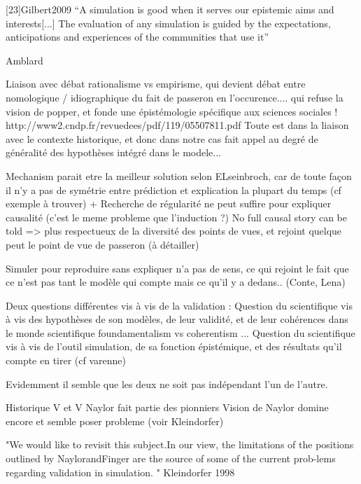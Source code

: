 


[23]Gilbert2009 \enquote{A simulation is good when it serves our epistemic aims and interests[...] The evaluation of any simulation is guided by the expectations, anticipations and experiences of the communities that use it}

Amblard

Liaison avec débat rationalisme vs empirisme, qui devient débat entre nomologique / idiographique
du fait de passeron en l'occurence.... qui refuse la vision de popper, et fonde une épistémologie spécifique aux sciences sociales ! http://www2.cndp.fr/revuedees/pdf/119/05507811.pdf
Toute est dans la liaison avec le contexte historique, et donc dans notre cas fait appel au degré de généralité des hypothèses intégré dans le modele...

Mechanism parait etre la meilleur solution selon ELseinbroch, car de toute façon il n'y a pas de symétrie entre prédiction et explication la plupart du temps (cf exemple à trouver) + Recherche de régularité ne peut suffire pour expliquer causalité (c'est le meme probleme que l'induction ?)
No full causal story can be told => plus respectueux de la diversité des points de vues, et rejoint quelque peut le point de vue de passeron (à détailler)

Simuler pour reproduire sans expliquer n'a pas de sens, ce qui rejoint le fait que ce n'est pas tant le modèle qui compte mais ce qu'il y a dedans.. (Conte, Lena)



Deux questions différentes vis à vis de la validation : 
Question du scientifique vis à vis des hypothèses de son modèles, de leur validité, et de leur cohérences dans le monde scientifique  foundamentalism vs coherentism ... 
Question du scientifique vis à vis de l'outil simulation, de sa fonction épistémique, et des résultats qu'il compte en tirer (cf varenne)

Evidemment il semble que les deux ne soit pas indépendant l'un de l'autre.

Historique V et V
Naylor fait partie des pionniers
Vision de Naylor domine encore et semble poser probleme (voir Kleindorfer)

"We would like to revisit this subject.In our view, the limitations of the positions outlined by NaylorandFinger are the source of some of the current prob-lems regarding validation in simulation. " Kleindorfer 1998

